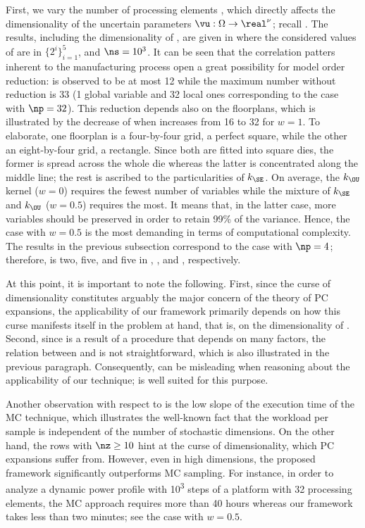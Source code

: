 First, we vary the number of processing elements \np, which directly affects the
dimensionality of the uncertain parameters $\vu: \Omega \to \real^\nu$; recall
. The results, including the dimensionality \nz of \vz,
are given in  where the considered values of \np
are in $\{ 2^i \}_{i = 1}^5$, and $\ns = 10^3$. It can be seen that the
correlation patters inherent to the manufacturing process \cite{cheng2011} open
a great possibility for model order reduction: \nz is observed to be at most 12
while the maximum number without reduction is 33 (1 global variable and 32 local
ones corresponding to the case with $\np = 32$). This reduction depends also on
the floorplans, which is illustrated by the decrease of \nz when \np increases
from 16 to 32 for $w = 1$. To elaborate, one floorplan is a four-by-four grid, a
perfect square, while the other an eight-by-four grid, a rectangle. Since both
are fitted into square dies, the former is spread across the whole die whereas
the latter is concentrated along the middle line; the rest is ascribed to the
particularities of $k_\SE$. On average, the $k_\OU$ kernel ($w = 0$) requires
the fewest number of variables while the mixture of $k_\SE$ and $k_\OU$ ($w =
0.5$) requires the most. It means that, in the latter case, more variables
should be preserved in order to retain 99\% of the variance. Hence, the case
with $w = 0.5$ is the most demanding in terms of computational complexity. The
results in the previous subsection correspond to the case with $\np = 4$;
therefore, \nz is two, five, and five in ,
, and , respectively.

At this point, it is important to note the following. First, since the curse of
dimensionality constitutes arguably the major concern of the theory of \ac{PC}
expansions, the applicability of our framework primarily depends on how this
curse manifests itself in the problem at hand, that is, on the dimensionality
\nz of \vz. Second, since \vz is a result of a procedure that depends on many
factors, the relation between \vu and \vz is not straightforward, which is also
illustrated in the previous paragraph. Consequently, \nu can be misleading when
reasoning about the applicability of our technique; \nz is well suited for this
purpose.

Another observation with respect to  is the low
slope of the execution time of the \ac{MC} technique, which illustrates the
well-known fact that the workload per sample is independent of the number of
stochastic dimensions. On the other hand, the rows with $\nz \geq 10$ hint at
the curse of dimensionality, which \ac{PC} expansions suffer from. However, even
in high dimensions, the proposed framework significantly outperforms \ac{MC}
sampling. For instance, in order to analyze a dynamic power profile with
10\textsuperscript{3} steps of a platform with 32 processing elements, the
\ac{MC} approach requires more than 40 hours whereas our framework takes less
than two minutes; see the case with $w = 0.5$.

